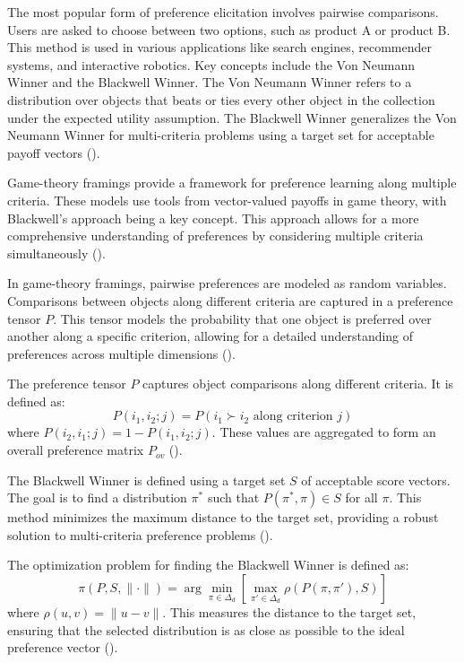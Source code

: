 \documentclass[
  letterpaper,
  numbers=noenddot,
  DIV=11,
  oneside]{scrreprt}
\theoremstyle{remark}
\begin{document}
The most popular form of preference elicitation involves pairwise
comparisons. Users are asked to choose between two options, such as
product A or product B. This method is used in various applications like
search engines, recommender systems, and interactive robotics. Key
concepts include the Von Neumann Winner and the Blackwell Winner. The
Von Neumann Winner refers to a distribution over objects that beats or
ties every other object in the collection under the expected utility
assumption. The Blackwell Winner generalizes the Von Neumann Winner for
multi-criteria problems using a target set for acceptable payoff vectors
().

Game-theory framings provide a framework for preference learning along
multiple criteria. These models use tools from vector-valued payoffs in
game theory, with Blackwell's approach being a key concept. This
approach allows for a more comprehensive understanding of preferences by
considering multiple criteria simultaneously
().

In game-theory framings, pairwise preferences are modeled as random
variables. Comparisons between objects along different criteria are
captured in a preference tensor \(P\). This tensor models the
probability that one object is preferred over another along a specific
criterion, allowing for a detailed understanding of preferences across
multiple dimensions ().

The preference tensor \(P\) captures object comparisons along different
criteria. It is defined as:
\[P(i_1, i_2; j) = P(i_1 \succ i_2 \text{ along criterion } j)\] where
\(P(i_2, i_1; j) = 1 - P(i_1, i_2; j)\). These values are aggregated to
form an overall preference matrix \(P_{ov}\)
().

The Blackwell Winner is defined using a target set \(S\) of acceptable
score vectors. The goal is to find a distribution \(\pi^*\) such that
\(P(\pi^*, \pi) \in S\) for all \(\pi\). This method minimizes the
maximum distance to the target set, providing a robust solution to
multi-criteria preference problems
().

The optimization problem for finding the Blackwell Winner is defined as:
\[\pi(P, S, \|\cdot\|) = \arg \min_{\pi \in \Delta_d} \left[ \max_{\pi' \in \Delta_d} \rho(P(\pi, \pi'), S) \right]\]
where \(\rho(u, v) = \|u - v\|\). This measures the distance to the
target set, ensuring that the selected distribution is as close as
possible to the ideal preference vector
().
\end{document}
